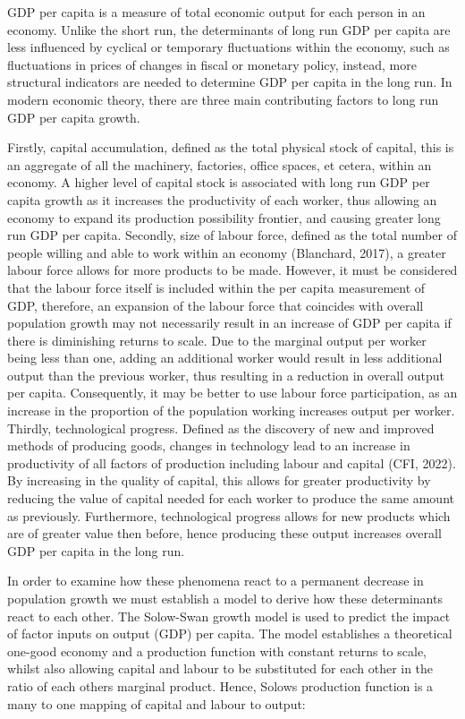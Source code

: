 \documentclass[
]{article}
\begin{document}
GDP per capita is a measure of total economic output for each person in
an economy. Unlike the short run, the determinants of long run GDP per
capita are less influenced by cyclical or temporary fluctuations within
the economy, such as fluctuations in prices of changes in fiscal or
monetary policy, instead, more structural indicators are needed to
determine GDP per capita in the long run. In modern economic theory,
there are three main contributing factors to long run GDP per capita
growth.

Firstly, capital accumulation, defined as the total physical stock of
capital, this is an aggregate of all the machinery, factories, office
spaces, et cetera, within an economy. A higher level of capital stock is
associated with long run GDP per capita growth as it increases the
productivity of each worker, thus allowing an economy to expand its
production possibility frontier, and causing greater long run GDP per
capita. Secondly, size of labour force, defined as the total number of
people willing and able to work within an economy (Blanchard, 2017), a
greater labour force allows for more products to be made. However, it
must be considered that the labour force itself is included within the
per capita measurement of GDP, therefore, an expansion of the labour
force that coincides with overall population growth may not necessarily
result in an increase of GDP per capita if there is diminishing returns
to scale. Due to the marginal output per worker being less than one,
adding an additional worker would result in less additional output than
the previous worker, thus resulting in a reduction in overall output per
capita. Consequently, it may be better to use labour force
participation, as an increase in the proportion of the population
working increases output per worker. Thirdly, technological progress.
Defined as the discovery of new and improved methods of producing goods,
changes in technology lead to an increase in productivity of all factors
of production including labour and capital (CFI, 2022). By increasing in
the quality of capital, this allows for greater productivity by reducing
the value of capital needed for each worker to produce the same amount
as previously. Furthermore, technological progress allows for new
products which are of greater value then before, hence producing these
output increases overall GDP per capita in the long run.

In order to examine how these phenomena react to a permanent decrease in
population growth we must establish a model to derive how these
determinants react to each other. The Solow-Swan growth model is used to
predict the impact of factor inputs on output (GDP) per capita. The
model establishes a theoretical one-good economy and a production
function with constant returns to scale, whilst also allowing capital
and labour to be substituted for each other in the ratio of each others
marginal product. Hence, Solow\textquotesingle s production function is
a many to one mapping of capital and labour to output:
\end{document}
